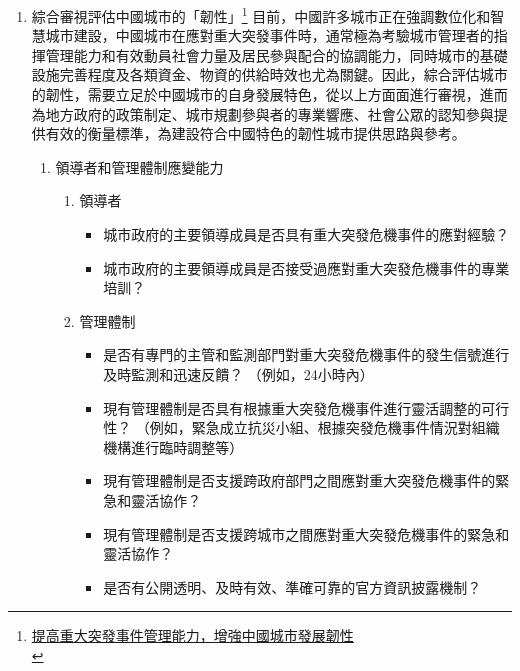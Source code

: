 \documentclass[a4paper,12pt]{article}
\begin{document}
\begin{enumerate}
\item 綜合審視評估中國城市的「韌性」\footnote{\href{https://www.google.com/url?sa=t\&rct=j\&q=\&esrc=s\&source=web\&cd=\&cad=rja\&uact=8\&ved=2ahUKEwin1OfxgcTvAhVmHKYKHZ3HBdgQFjAAegQIBRAD\&url=https\%3A\%2F\%2Fwww.pwccn.com\%2Fzh\%2Fconsulting\%2Fpublications\%2Fresilient-city.pdf\&usg=AOvVaw3Hqz75zjZH72R-USxTaGjH}{提高重大突發事件管理能力，增強中國城市發展韌性}\\}
\label{sec:orgf545f4c}
目前，中國許多城市正在強調數位化和智慧城市建設，中國城市在應對重大突發事件時，通常極為考驗城市管理者的指揮管理能力和有效動員社會力量及居民參與配合的協調能力，同時城市的基礎設施完善程度及各類資金、物資的供給時效也尤為關鍵。因此，綜合評估城市的韌性，需要立足於中國城市的自身發展特色，從以上方面面進行審視，進而為地方政府的政策制定、城市規劃參與者的專業響應、社會公眾的認知參與提供有效的衡量標準，為建設符合中國特色的韌性城市提供思路與參考。\\
\begin{enumerate}
\item 領導者和管理體制應變能力
\label{sec:org9b8fe7c}
\begin{enumerate}
\item 領導者
\label{sec:org8fe5c82}
\begin{itemize}
\item 城市政府的主要領導成員是否具有重大突發危機事件的應對經驗？\\
\item 城市政府的主要領導成員是否接受過應對重大突發危機事件的專業培訓？\\
\end{itemize}
\item 管理體制
\label{sec:org6353f46}
\begin{itemize}
\item 是否有專門的主管和監測部門對重大突發危機事件的發生信號進行及時監測和迅速反饋？  （例如，24小時內）\\
\item 現有管理體制是否具有根據重大突發危機事件進行靈活調整的可行性？  （例如，緊急成立抗災小組、根據突發危機事件情況對組織機構進行臨時調整等）\\
\item 現有管理體制是否支援跨政府部門之間應對重大突發危機事件的緊急和靈活協作？\\
\item 現有管理體制是否支援跨城市之間應對重大突發危機事件的緊急和靈活協作？\\
\item 是否有公開透明、及時有效、準確可靠的官方資訊披露機制？\\

\end{itemize}
\end{enumerate}
\end{enumerate}
\end{enumerate}
\end{document}
